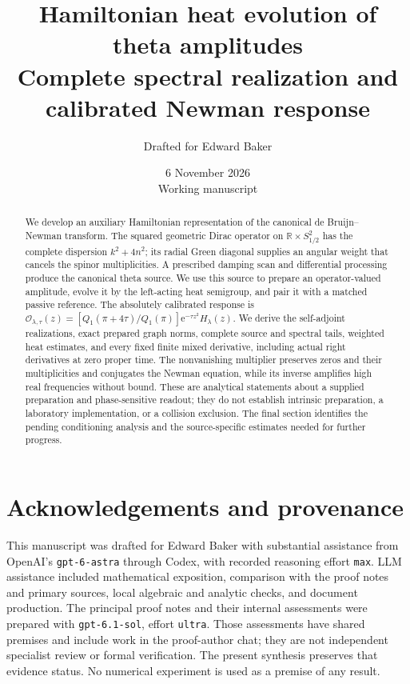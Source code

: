 \documentclass[11pt]{article}
\title{Hamiltonian heat evolution of theta amplitudes\\[4pt]
\large Complete spectral realization and calibrated Newman response}
\author{Drafted for Edward Baker}
\date{6 November 2026\\\small Working manuscript}
\theoremstyle{definition}
\theoremstyle{remark}
\numberwithin{equation}{section}
\newcommand{\R}{\mathbb R}
\newcommand{\Obs}{\mathcal O}
\newcommand{\ee}{\mathrm e}
\begin{document}
\maketitle
\begin{abstract}
We develop an auxiliary Hamiltonian representation of the canonical
de Bruijn--Newman transform. The squared geometric Dirac operator on
$\R\times S^2_{1/2}$ has the complete dispersion $k^2+4n^2$; its radial
Green diagonal supplies an angular weight that cancels the spinor
multiplicities. A prescribed damping scan and differential processing
produce the canonical theta source. We use this source to prepare an
operator-valued amplitude, evolve it by the left-acting heat semigroup,
and pair it with a matched passive reference. The absolutely calibrated
response is
$\Obs_{\lambda,\tau}(z)=
 [Q_1(\pi+4\tau)/Q_1(\pi)]\ee^{-\tau z^2}H_\lambda(z)$.
We derive the self-adjoint realizations, exact prepared graph norms,
complete source and spectral tails, weighted heat estimates, and every
fixed finite mixed derivative, including actual right derivatives at
zero proper time. The nonvanishing multiplier preserves zeros and their
multiplicities and conjugates the Newman equation, while its inverse
amplifies high real frequencies without bound. These are analytical
statements about a supplied preparation and phase-sensitive readout;
they do not establish intrinsic preparation, a laboratory implementation,
or a collision exclusion. The final section identifies the pending
conditioning analysis and the source-specific estimates needed for
further progress.
\end{abstract}
\tableofcontents
\clearpage










\section*{Acknowledgements and provenance}
This manuscript was drafted for Edward Baker with substantial assistance
from OpenAI's \texttt{gpt-6-astra} through Codex, with recorded reasoning
effort \texttt{max}. LLM assistance included mathematical exposition,
comparison with the proof notes and primary sources, local algebraic and
analytic checks, and document production. The principal proof notes and
their internal assessments were prepared with \texttt{gpt-6.1-sol}, effort
\texttt{ultra}. Those assessments have shared premises and include work
in the proof-author chat; they are not independent specialist review or
formal verification. The present synthesis preserves that evidence status.
No numerical experiment is used as a premise of any result.

\begingroup
\small


\endgroup
\end{document}
